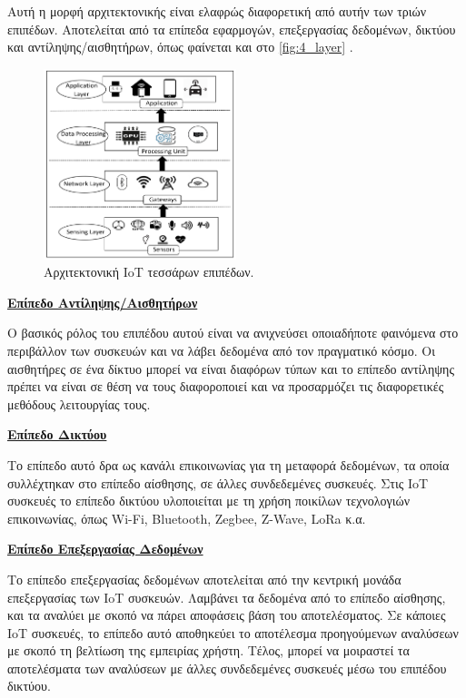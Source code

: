 Αυτή η μορφή αρχιτεκτονικής είναι ελαφρώς διαφορετική από αυτήν των τριών επιπέδων. Αποτελείται από τα επίπεδα εφαρμογών, επεξεργασίας δεδομένων, δικτύου και αντίληψης/αισθητήρων, όπως φαίνεται και στο \autoref{fig:4_layer} \cite{bib:kumar_2018}.

\begin{figure}[!ht]
	\centering
	\includegraphics[width=0.5\textwidth]{./images/chapter2/4_layer.png}
	\caption{Αρχιτεκτονική IoT τεσσάρων επιπέδων.}
	\label{fig:4_layer}
\end{figure}

\textbf{\underline{Επίπεδο Αντίληψης/Αισθητήρων}}

Ο βασικός ρόλος του επιπέδου αυτού είναι να ανιχνεύσει οποιαδήποτε φαινόμενα στο περιβάλλον των συσκευών και να λάβει δεδομένα από τον πραγματικό κόσμο. Οι αισθητήρες σε ένα δίκτυο μπορεί να είναι διαφόρων τύπων και το επίπεδο αντίληψης πρέπει να είναι σε θέση να τους διαφοροποιεί και να προσαρμόζει τις διαφορετικές μεθόδους λειτουργίας τους. 

\textbf{\underline{Επίπεδο Δικτύου}}

Το επίπεδο αυτό δρα ως κανάλι επικοινωνίας για τη μεταφορά δεδομένων, τα οποία συλλέχτηκαν στο επίπεδο αίσθησης, σε άλλες συνδεδεμένες συσκευές. Στις IoT συσκευές το επίπεδο δικτύου υλοποιείται με τη χρήση ποικίλων τεχνολογιών επικοινωνίας, όπως Wi-Fi, Bluetooth, Zegbee, Z-Wave, LoRa κ.α.

\textbf{\underline{Επίπεδο Επεξεργασίας Δεδομένων}}

Το επίπεδο επεξεργασίας δεδομένων αποτελείται από την κεντρική μονάδα επεξεργασίας των IoT συσκευών. Λαμβάνει τα δεδομένα από το επίπεδο αίσθησης, και τα αναλύει με σκοπό να πάρει αποφάσεις βάση του αποτελέσματος. Σε κάποιες IoT συσκευές, το επίπεδο αυτό αποθηκεύει το αποτέλεσμα προηγούμενων αναλύσεων με σκοπό τη βελτίωση της εμπειρίας χρήστη. Τέλος, μπορεί να μοιραστεί τα αποτελέσματα των αναλύσεων με άλλες συνδεδεμένες συσκευές μέσω του επιπέδου δικτύου.


